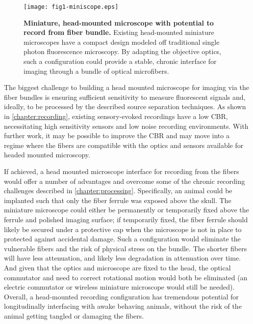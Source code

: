 \begin{figure}
\texttt{[image: fig1-miniscope.eps]}
\caption[Miniature microscope]{\textbf{Miniature, head-mounted 
microscope with potential to record from fiber bundle.} Existing 
head-mounted miniature microscopes have a compact design modeled 
off traditional single photon fluorescence microscopy. By 
adapting the objective optics, such a configuration could 
provide a stable, chronic interface for imaging through a bundle 
of optical microfibers. \cite{LibertiIII:2017df}}
\label{fig:miniscope}
\end{figure}

The biggest challenge to building a head 
mounted microscope for imaging via the fiber 
bundles is ensuring sufficient sensitivity 
to measure fluorescent signals and, ideally,
to be processed by the described source 
separation techniques. As shown in 
\cref{chapter:recording}, existing 
sensory-evoked recordings have a low 
CBR, necessitating high sensitivity sensors 
and low noise recording environments. With 
further work, it may be possible to improve 
the CBR and may move into a regime where the 
fibers are compatible with the optics and 
sensors available for headed mounted microscopy.

If achieved, a head mounted microscope interface 
for recording from the fibers would offer a number 
of advantages and overcome some of the chronic 
recording challenges described in 
\cref{chapter:processing}. Specifically, an animal 
could be implanted such that only the fiber ferrule 
was exposed above the skull. The miniature 
microscope could either be permanently or temporarily 
fixed above the ferrule and polished imaging surface; 
if temporarily fixed, the fiber ferrule should likely 
be secured under a protective cap when the microscope 
is not in place to protected against accidental 
damage. Such a configuration would eliminate the 
vulnerable fibers and the risk of physical stress on 
the bundle. The shorter fibers will have less 
attenuation, and likely less degradation in attenuation 
over time. And given that the optics and microscope 
are fixed to the head, the optical commutator and 
need to correct rotational motion would both be 
eliminated (an electric commutator or wireless miniature 
microscope would still be needed). Overall, a head-mounted 
recording configuration has tremendous potential for 
longitudinally interfacing with awake behaving animals, 
without the risk of the animal getting tangled or 
damaging the fibers.

